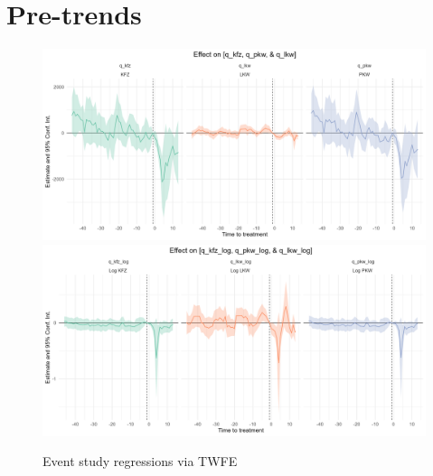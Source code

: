 \documentclass[a4paper, 10pt]{article}
\newcommand{\notes}[1]{\vspace{0.2cm} \caption*{ \scriptsize \textbf{Notes:} {#1}} }
\begin{document}
\section{Pre-trends}
\begin{figure}[H]
\centering
\caption{Event study regressions via TWFE}
\includegraphics[width = \textwidth]{../04_figures/twfe_monthly_pt.png} 
\includegraphics[width = \textwidth]{../04_figures/twfe_monthly_pt_log.png}
\end{figure}
\end{document}
